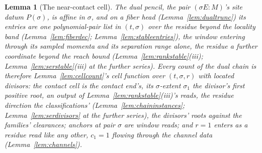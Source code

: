 \documentclass[11pt]{article}
\newtheorem{lemma}{Lemma}
\theoremstyle{definition}
\begin{document}
\begin{lemma}[The near-contact cell]\label{lem:contactcell}
The dual pencil, the pair $(\sigma E\!:\!M)$'s site datum
$P(\sigma)$, is affine in $\sigma$, and on a
fiber head (Lemma~\ref{lem:dualtrunc}) its entries are one
polynomial-pair list in $(t,\sigma)$ over the residue beyond the
locality band
(Lemma~\ref{lem:fiberdec}; Lemma~\ref{lem:stableentries}), the window entering
through its sampled momenta and its separation range alone, the residue a
further coordinate beyond the reach bound
(Lemma~\ref{lem:rankstable}(iii); Lemma~\ref{lem:serstable}(iii)
at the further series). Every count of the dual chain is
therefore Lemma~\ref{lem:cellcount}'s cell function over
$(t,\sigma,r)$ with located divisors: the \emph{contact cell} is the
contact end's, its $\sigma$-extent $\sigma_1$ the divisor's first positive
root, an output of
Lemma~\ref{lem:rankstable}(iii)'s reads, the residue direction the
classifications' (Lemma~\ref{lem:chaininstances};
Lemma~\ref{lem:serdivisors} at the further series), the divisors'
roots against the families' clearances; anchors at pair $\sigma$ are window
reads; and $r=1$ enters as a residue read like any other, $c_1=1$ flowing
through the channel data (Lemma~\ref{lem:channels}).


\end{lemma}
\end{document}
